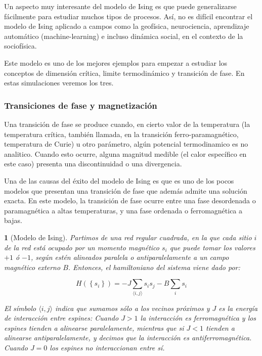 \documentclass[11pt, a4paper]{article} %
\theoremstyle{named}
\newtheorem*{namedtheorem}{}
\begin{document}
Un aspecto muy interesante del modelo de Ising es que puede generalizarse fácilmente para estudiar muchos tipos de procesos. Así, no es difícil encontrar el modelo de Ising aplicado a campos como la geofísica, neurociencia, aprendizaje automático (machine-learning) e incluso dinámica social, en el contexto de la sociofísica.

Este modelo es uno de los mejores ejemplos para empezar a estudiar los conceptos de dimensión crítica, limite termodinámico y transición de fase. En estas simulaciones veremos los tres.

\subsubsection{Transiciones de fase y magnetización}\label{sec:transiciones}

Una transición de fase se produce cuando, en cierto valor de la temperatura (la temperatura crítica, también llamada, en la transición ferro-paramagnético, temperatura de Curie) u otro parámetro, algún potencial termodinamico es no analitico. Cuando esto ocurre, alguna magnitud medible (el calor específico en este caso) presenta una discontinuidad o una divergencia.

Una de las causas del éxito del modelo de Ising es que es uno de los pocos modelos que presentan una transición de fase que además admite una solución exacta. En este modelo, la transición de fase ocurre entre una fase desordenada o paramagnética a altas temperaturas, y una fase ordenada o ferromagnética a bajas.

\begin{namedtheorem}[Modelo de Ising]
Partimos de una red regular cuadrada, en la que cada sitio $i$ de la red está ocupado por un momento magnético $s_i$ que puede tomar los valores $+1$ ó $-1$, según estén alineados paralela o antiparalelamente a un campo magnético externo $B$. Entonces, el hamiltoniano del sistema viene dado por:

\begin{equation}\label{eq:isingHam}
H\left(\left\{s_{i}\right\}\right)=-J \sum_{\langle i, j\rangle} s_{i} s_{j} - B \sum_i s_i
\end{equation}

El símbolo $\langle i, j\rangle$ indica que sumamos sólo a los vecinos próximos y $J$ es la energía de interacción entre espines: Cuando $J > 1$ la interacción es ferromagnética y los espines tienden a alinearse paralelamente, mientras que si $J<1$ tienden a alinearse antiparalelamente, y decimos que la interacción es antiferromagnética. Cuando $J=0$ los espines no interaccionan entre sí.
\end{namedtheorem}
\end{document}
